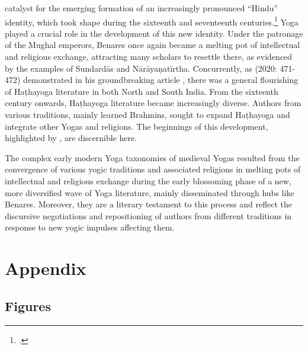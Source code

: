 catalyst for the emerging formation of an increasingly pronounced ``Hindu'' identity, which took shape during the sixteenth and seventeenth centuries.\footnote{\citeauthor[2006: 188]{clark2006}.} Yoga played a crucial role in the development of this new identity. Under the patronage of the Mughal emperors, Benares once again became a melting pot of intellectual and religious exchange, attracting many scholars to resettle there, as evidenced by the examples of Sundardās and Nārāyaṇatīrtha. Concurrently, as \citeauthor{birch2020} (2020: 471-472) demonstrated in his groundbreaking article , there was a general flourishing of Haṭhayoga literature in both North and South India. From the sixteenth century onwards, Haṭhayoga literature became increasingly diverse. Authors from various traditions, mainly learned Brahmins, sought to expand Haṭhayoga and integrate other Yogas and religions. The beginnings of this development, highlighted by \citeauthor{birch2020}, are discernible here.

The complex early modern Yoga taxonomies of medieval Yogas resulted from the convergence of various yogic traditions and associated religions in melting pots of intellectual and religious exchange during the early blossoming phase of a new, more diversified wave of Yoga literature, mainly disseminated through hubs like Benares. Moreover, they are a literary testament to this process and reflect the discursive negotiations and repositioning of authors from different traditions in response to new yogic impulses affecting them.

\chapter{Appendix}
\section{Figures}

